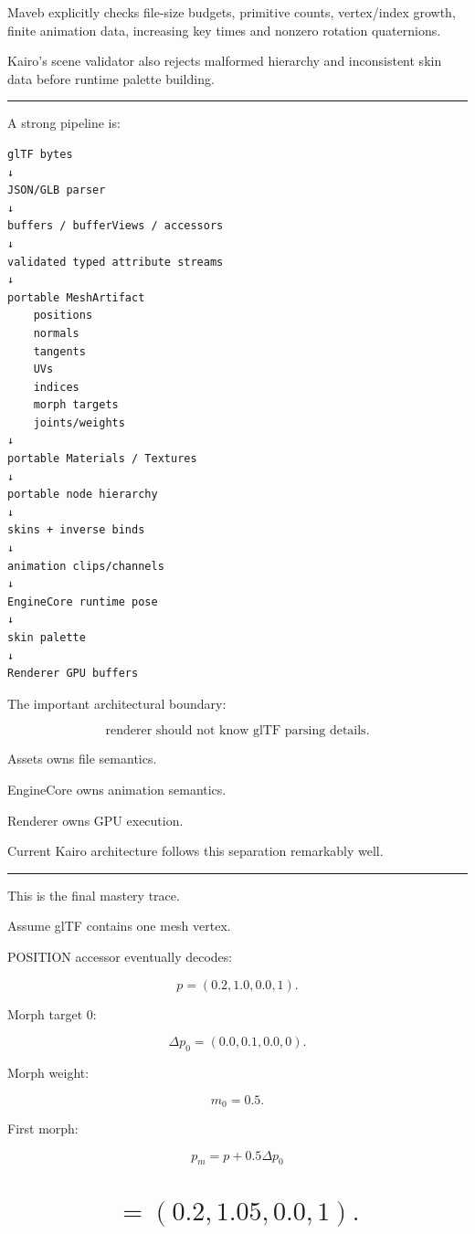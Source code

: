 Maveb explicitly checks file-size budgets, primitive counts, vertex/index growth, finite animation data, increasing key times and nonzero rotation quaternions.

Kairo's scene validator also rejects malformed hierarchy and inconsistent skin data before runtime palette building.

\begin{center}\rule{0.5\linewidth}{0.5pt}\end{center}

A strong pipeline is:

\begin{verbatim}
glTF bytes
↓
JSON/GLB parser
↓
buffers / bufferViews / accessors
↓
validated typed attribute streams
↓
portable MeshArtifact
    positions
    normals
    tangents
    UVs
    indices
    morph targets
    joints/weights
↓
portable Materials / Textures
↓
portable node hierarchy
↓
skins + inverse binds
↓
animation clips/channels
↓
EngineCore runtime pose
↓
skin palette
↓
Renderer GPU buffers
\end{verbatim}

The important architectural boundary:

\[
\boxed{
\text{renderer should not know glTF parsing details}.
}
\]

Assets owns file semantics.

EngineCore owns animation semantics.

Renderer owns GPU execution.

Current Kairo architecture follows this separation remarkably well.

\begin{center}\rule{0.5\linewidth}{0.5pt}\end{center}

This is the final mastery trace.

Assume glTF contains one mesh vertex.

POSITION accessor eventually decodes:

\[
p=
(0.2,1.0,0.0,1).
\]

Morph target 0:

\[
\Delta p_0=
(0.0,0.1,0.0,0).
\]

Morph weight:

\[
m_0=0.5.
\]

First morph:

\[
p_m
=
p+
0.5\Delta p_0
\]

\section{\texorpdfstring{\[
=
(0.2,1.05,0.0,1).
\]}{
=
(0.2,1.05,0.0,1).
}}\label{04-visual-computing-ii-ch041-section}

